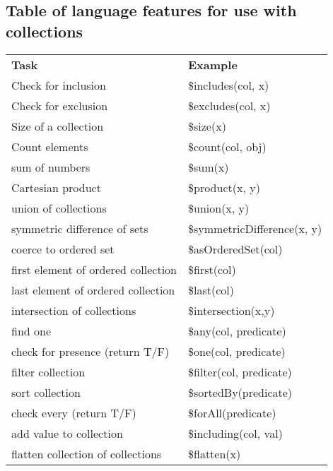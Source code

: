 \documentclass[9pt,letterpaper]{article}
\begin{document}
\subsection{Table of language features for use with collections}
\begin{table}[H]
\begin{tabular}{l | l }
\textbf{Task}                       & \textbf{Example}               \\ \hhline{=|=}
Check for inclusion                 & \$includes(col, x)             \\
Check for exclusion                 & \$excludes(col, x)             \\
Size of a collection                & \$size(x)                      \\
Count elements                      & \$count(col, obj)              \\
sum of  numbers                     & \$sum(x)                       \\
Cartesian product                   & \$product(x, y)                \\
union of collections                & \$union(x, y)                  \\
symmetric difference of sets        & \$symmetricDifference(x, y)    \\
coerce to ordered set               & \$asOrderedSet(col)            \\
first element of ordered collection & \$first(col)                   \\
last element of ordered collection  & \$last(col)                    \\
intersection of collections         & \$intersection(x,y)            \\
find one                            & \$any(col, predicate)          \\
check for presence (return T/F)     & \$one(col, predicate)          \\
filter collection                   & \$filter(col, predicate)       \\
sort collection                     & \$sortedBy(predicate)          \\
check every (return T/F)            & \$forAll(predicate)            \\
add value to collection             & \$including(col, val)          \\
flatten collection of collections   & \$flatten(x)
\end{tabular}
\end{table}



\end{document}
